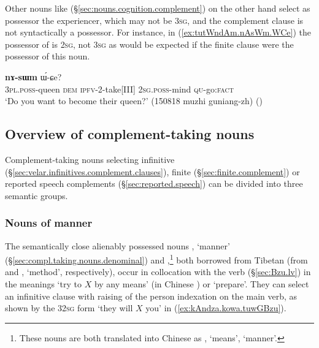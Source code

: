 Other nouns like  (§\ref{sec:nouns.cognition.complement}) on the other hand select as possessor the experiencer, which may not be \textsc{3sg}, and the complement clause is not syntactically a possessor. For instance, in (\ref{ex:tutWndAm.nAsWm.WCe}) the possessor of  is \textsc{2sg}, not \textsc{3sg} as would be expected if the finite clause  were the possessor of this noun.

 \begin{exe}
\ex \label{ex:tutWndAm.nAsWm.WCe}
 \textbf{nɤ-sɯm} ɯ́-ɕe? \\
\textsc{3pl}.\textsc{poss}-queen \textsc{dem} \textsc{ipfv}-2-take[III] \textsc{2sg}.\textsc{poss}-mind \textsc{qu}-go:\textsc{fact} \\
\glt `Do you want to become their queen?' (150818 muzhi guniang-zh)
()
\end{exe}

\subsection{Overview of complement-taking nouns} \label{sec:complement.taking.noun.list}
Complement-taking nouns selecting infinitive (§\ref{sec:velar.infinitives.complement.clauses}), finite (§\ref{sec:finite.complement}) or reported speech complements (§\ref{sec:reported.speech}) can be divided into three semantic groups.

\subsubsection{Nouns of manner} \label{sec:nouns.manner.complement}
The semantically close alienably possessed nouns  , `manner' (§\ref{sec:compl.taking.nouns.denominal}) and ,\footnote{These nouns are both translated into Chinese as , `means', `manner'.} both borrowed from Tibetan (from  and , `method', respectively), occur in collocation with the verb  (§\ref{sec:Bzu.lv}) in the meanings `try to $X$ by any means' (in Chinese ) or `prepare'. They can select an infinitive clause with raising of the person indexation on the main verb, as shown by the 3\fl{}\textsc{2sg} form  `they will $X$ you' in (\ref{ex:kAndza.kowa.tuwGBzu}). 
   

